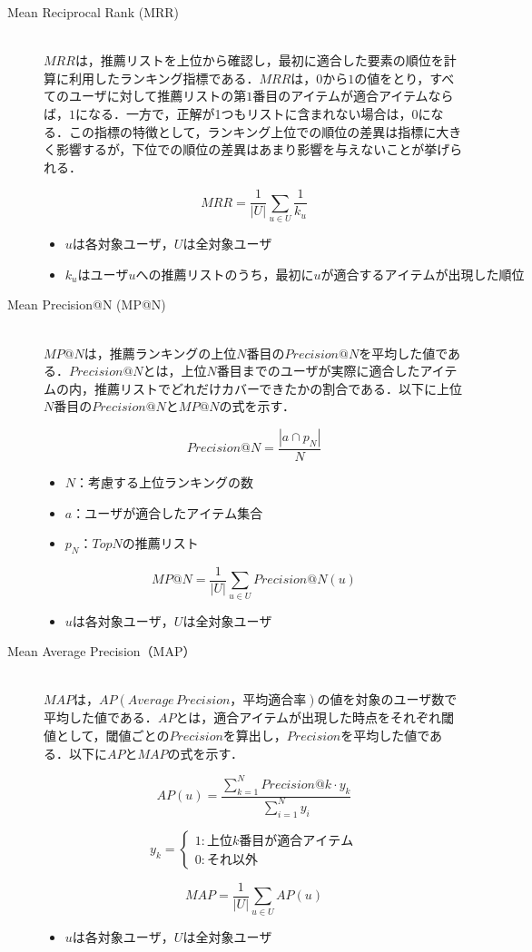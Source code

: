 \documentclass[12pt]{jarticle} %
\begin{document}
\begin{description}
\item[Mean Reciprocal Rank (MRR)]~\\
$MRR$は，推薦リストを上位から確認し，最初に適合した要素の順位を計算に利用したランキング指標である．$MRR$は，$0$から$1$の値をとり，すべてのユーザに対して推薦リストの第$1$番目のアイテムが適合アイテムならば，$1$になる．一方で，正解が1つもリストに含まれない場合は，$0$になる．この指標の特徴として，ランキング上位での順位の差異は指標に大きく影響するが，下位での順位の差異はあまり影響を与えないことが挙げられる．

\[
MRR =
\frac{1}{|U|}\sum_{u\in U} \frac{1}{k_u}
\]
\begin{itemize}
\item $uは各対象ユーザ，Uは全対象ユーザ$
\item $k_uはユーザuへの推薦リストのうち，最初にuが適合するアイテムが出現した順位$
\end{itemize}

\item[Mean Precision@N (MP@N)]~\\
$MP@N$は，推薦ランキングの上位$N$番目の$Precision@N$を平均した値である．$Precision@N$とは，上位$N$番目までのユーザが実際に適合したアイテムの内，推薦リストでどれだけカバーできたかの割合である．以下に上位$N$番目の$Precision@N$と$MP@N$の式を示す．

\[
Precision@N =
\frac{|a \cap p_N|}{N}
\]
\begin{itemize}
\item $N：考慮する上位ランキングの数$
\item $a：ユーザが適合したアイテム集合$
\item $p_N：TopNの推薦リスト$
\end{itemize}

\[
MP@N =
\frac{1}{|U|}\sum_{u\in U} Precision@N(u)
\]
\begin{itemize}
\item $uは各対象ユーザ，Uは全対象ユーザ$
\end{itemize}



\item[Mean Average Precision（MAP）]~\\
$MAP$は，$AP(Average\, Precision，平均適合率)$の値を対象のユーザ数で平均した値である．$AP$とは，適合アイテムが出現した時点をそれぞれ閾値として，閾値ごとの$Precision$を算出し，$Precision$を平均した値である．以下に$AP$と$MAP$の式を示す．

\[
AP(u) =
 \frac{\sum_{k=1}^{N} Precision@k \cdot y_k}{\sum_{i=1}^{N}y_i}
\]

\[
y_k = \begin{cases}
1 : 上位k番目が適合アイテム \\
0 : それ以外
\end{cases}
\]

\[
MAP =
\frac{1}{|U|}\sum_{u\in U} AP(u)
\]
\begin{itemize}
\item $uは各対象ユーザ，Uは全対象ユーザ$
\end{itemize}

\end{description}
\end{document}
